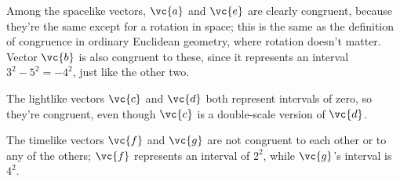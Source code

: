 Among the spacelike vectors, $\vc{a}$ and $\vc{e}$ are clearly congruent,
because they're the same except for a rotation in space; this is the same
as the definition of congruence in ordinary Euclidean geometry, where rotation
doesn't matter. Vector $\vc{b}$ is also congruent to these, since it
represents an interval $3^2-5^2=-4^2$, just like the other two.

The lightlike vectors $\vc{c}$ and $\vc{d}$ both represent intervals of
zero, so they're congruent, even though $\vc{c}$ is a double-scale version
of $\vc{d}$.

The timelike vectors $\vc{f}$ and $\vc{g}$ are not congruent to each other
or to any of the others; $\vc{f}$ represents an interval of $2^2$, while
$\vc{g}$'s interval is $4^2$.
